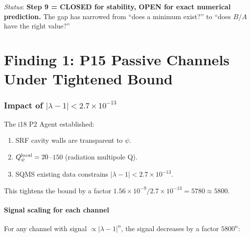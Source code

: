 \documentclass[11pt]{article}
\newcommand{\ee}[1]{\times 10^{#1}}
\newcommand{\lbone}{|\lambda - 1|}
\newcommand{\Qpsi}{Q_\psi}
\begin{document}
\begin{tcolorbox}[colback=blue!5!white, colframe=blue!60!black,
  title=\textbf{W4i19 TOP 5 FINDINGS --- Ranked by Programme Impact}]
\begin{enumerate}
  \textit{Status}: \textbf{Step 9 = CLOSED for stability, OPEN
  for exact numerical prediction.} The gap has narrowed from
  ``does a minimum exist?'' to ``does $B/A$ have the right value?''

\end{enumerate}
\end{tcolorbox}

\newpage

\part{Finding 1: P15 Passive Channels Under Tightened Bound}
\label{part:p15}

\section{Impact of $\lbone < 2.7\ee{-13}$}

The i18 P2 Agent established:
\begin{enumerate}[nosep]
\item SRF cavity walls are transparent to $\psi$.
\item $\Qpsi^{\rm local} = 20$--$150$ (radiation multipole Q).
\item SQMS existing data constrains $\lbone < 2.7\ee{-13}$.
\end{enumerate}

This tightens the bound by a factor $1.56\ee{-9} / 2.7\ee{-13}
= 5780 \approx 5800$.

\subsection{Signal scaling for each channel}

For any channel with signal $\propto \lbone^n$, the signal decreases
by a factor $5800^n$:
\end{document}
